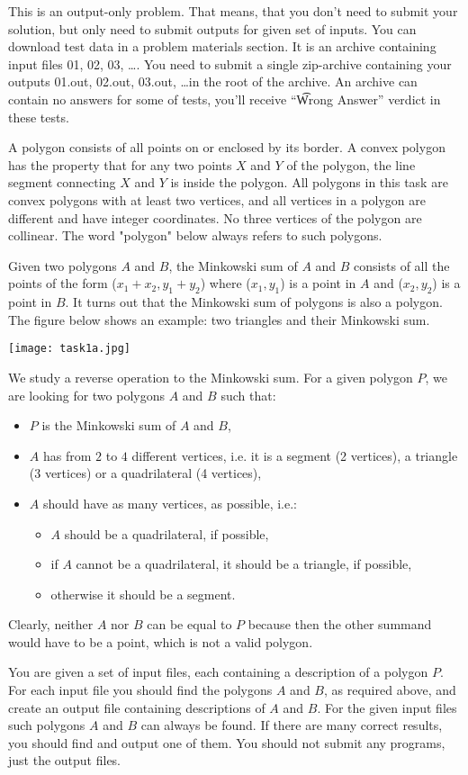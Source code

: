 This is an output-only problem. That means, that you don't need to submit your solution, but only need to submit outputs for given set of inputs. You can download test data in a problem materials section. It is an archive containing input files 01, 02, 03, \dots. You need to submit a single zip-archive containing your outputs 01.out, 02.out, 03.out, \dots in the root of the archive.  An archive can contain no answers for some of tests, you'll receive ``\t{Wrong Answer}'' verdict in these tests.


A polygon consists of all points on or enclosed by its border. A convex polygon has the property that for any two points $X$ and $Y$ of the polygon, the line segment connecting $X$ and $Y$ is inside the polygon. All polygons in this task are convex polygons with at least two vertices, and all vertices in a polygon are different and have integer coordinates. No three vertices of the polygon are collinear. The word "polygon" below always refers to such polygons.

Given two polygons $A$ and $B$, the Minkowski sum of $A$ and $B$ consists of all the points of the form ($x_1+x_2, y_1+y_2$) where ($x_1, y_1$) is a point in $A$ and ($x_2, y_2$) is a point in $B$. It turns out that the Minkowski sum of polygons is also a polygon. The figure below shows an example: two triangles and their Minkowski sum.

\texttt{[image: task1a.jpg]}

We study a reverse operation to the Minkowski sum. For a given polygon $P$, we are looking for two polygons $A$ and $B$ such that:
\begin{itemize}
\item $P$ is the Minkowski sum of $A$ and $B$,
\item $A$ has from $2$ to $4$ different vertices, i.e. it is a segment (2 vertices), a triangle (3 vertices) or a quadrilateral (4 vertices),
\item $A$ should have as many vertices, as possible, i.e.:
\begin {itemize}
\item $A$ should be a quadrilateral, if possible,
\item if $A$ cannot be a quadrilateral, it should be a triangle, if possible,
\item otherwise it should be a segment.
\end{itemize}
\end{itemize}


Clearly, neither $A$ nor $B$ can be equal to $P$ because then the other summand would have to be a point, which is not a valid polygon. 

You are given a set of input files, each containing a description of a polygon $P$. For each input file you should find the polygons $A$ and $B$, as required above, and create an output file containing descriptions of $A$ and $B$. For the given input files such polygons $A$ and $B$ can always be found. If there are many correct results, you should find and output one of them. You should not submit any programs, just the output files.
